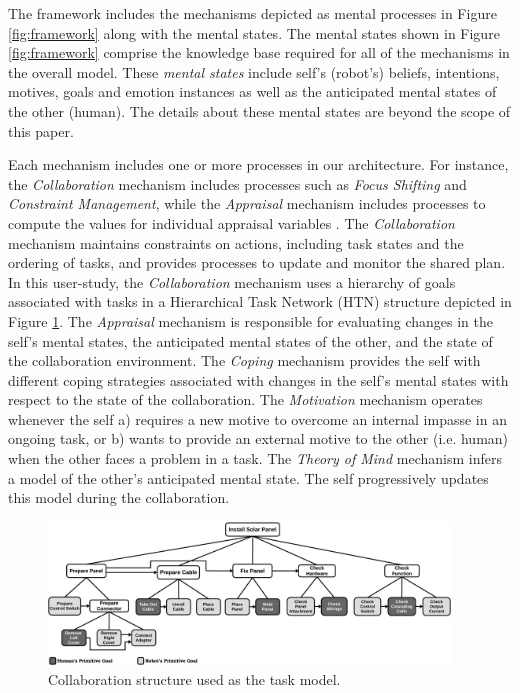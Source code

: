 \documentclass{sig-alternate-05-2015}
\begin{document}
The framework includes the mechanisms depicted as mental processes in Figure
\ref{fig:framework} along with the mental states. The mental
states shown in Figure \ref{fig:framework} comprise the knowledge base required
for all of the mechanisms in the overall model. These \textit{mental states}
include self's (robot's) beliefs, intentions, motives, goals and emotion
instances as well as the anticipated mental states of the other (human). The
details about these mental states are beyond the scope of this paper. 

Each mechanism includes one or more processes in our architecture. For instance,
the \textit{Collaboration} mechanism includes processes such as \textit{Focus
Shifting} and \textit{Constraint Management}, while the \textit{Appraisal}
mechanism includes processes to compute the values for individual appraisal
variables \cite{shayganfar:emotional-awareness}
\cite{shayganfar:appraisal-short}. The \textit{Collaboration} mechanism
maintains constraints on actions, including task states and the ordering of
tasks, and provides processes to update and monitor the shared plan. In this
user-study, the \textit{Collaboration} mechanism uses a hierarchy of goals
associated with tasks in a Hierarchical Task Network (HTN) structure
depicted in Figure \ref{fig:collaboration_structure}. The \textit{Appraisal}
mechanism is responsible for evaluating changes in the self's mental states, the
anticipated mental states of the other, and the state of the collaboration
environment. The \textit{Coping} mechanism provides the self with different
coping strategies associated with changes in the self's mental states with
respect to the state of the collaboration. The \textit{Motivation} mechanism
operates whenever the self a) requires a new motive to overcome an internal
impasse in an ongoing task, or b) wants to provide an external motive to the
other (i.e. human) when the other faces a problem in a task. The \textit{Theory
of Mind} mechanism infers a model of the other's anticipated mental state. The
self progressively updates this model during the collaboration.

\begin{figure}[tbh]
  \centering
  \includegraphics[width=0.95\textwidth]{figure/collaborationStructure.pdf}
  \caption{{\fontsize{9}{9}\selectfont Collaboration structure used as the
  task model.}}
  \label{fig:collaboration_structure}
  \vspace*{-5mm}
\end{figure}
\end{document}
